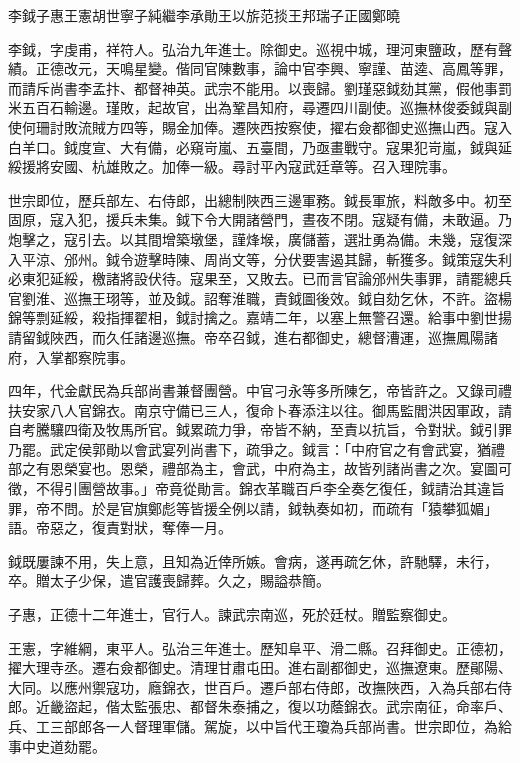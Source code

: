 
\begin{pinyinscope}
李鉞子惠王憲胡世寧子純繼李承勛王以旂范掞王邦瑞子正國鄭曉

李鉞，字虔甫，祥符人。弘治九年進士。除御史。巡視中城，理河東鹽政，歷有聲績。正德改元，天鳴星變。偕同官陳數事，論中官李興、寧謹、苗逵、高鳳等罪，而請斥尚書李孟抃、都督神英。武宗不能用。以喪歸。劉瑾惡鉞劾其黨，假他事罰米五百石輸邊。瑾敗，起故官，出為鞏昌知府，尋遷四川副使。巡撫林俊委鉞與副使何珊討敗流賊方四等，賜金加俸。遷陜西按察使，擢右僉都御史巡撫山西。寇入白羊口。鉞度宣、大有備，必窺岢嵐、五臺間，乃亟畫戰守。寇果犯岢嵐，鉞與延綏援將安國、杭雄敗之。加俸一級。尋討平內寇武廷章等。召入理院事。

世宗即位，歷兵部左、右侍郎，出總制陜西三邊軍務。鉞長軍旅，料敵多中。初至固原，寇入犯，援兵未集。鉞下令大開諸營門，晝夜不閉。寇疑有備，未敢逼。乃炮擊之，寇引去。以其間增築墩堡，謹烽堠，廣儲蓄，選壯勇為備。未幾，寇復深入平涼、邠州。鉞令遊擊時陳、周尚文等，分伏要害遏其歸，斬獲多。鉞策寇失利必東犯延綏，檄諸將設伏待。寇果至，又敗去。已而言官論邠州失事罪，請罷總兵官劉淮、巡撫王珝等，並及鉞。詔奪淮職，責鉞圖後效。鉞自劾乞休，不許。盜楊錦等剽延綏，殺指揮翟相，鉞討擒之。嘉靖二年，以塞上無警召還。給事中劉世揚請留鉞陜西，而久任諸邊巡撫。帝卒召鉞，進右都御史，總督漕運，巡撫鳳陽諸府，入掌都察院事。

四年，代金獻民為兵部尚書兼督團營。中官刁永等多所陳乞，帝皆許之。又錄司禮扶安家八人官錦衣。南京守備已三人，復命卜春添注以往。御馬監閻洪因軍政，請自考騰驤四衛及牧馬所官。鉞累疏力爭，帝皆不納，至責以抗旨，令對狀。鉞引罪乃罷。武定侯郭勛以會武宴列尚書下，疏爭之。鉞言：「中府官之有會武宴，猶禮部之有恩榮宴也。恩榮，禮部為主，會武，中府為主，故皆列諸尚書之次。宴圖可徵，不得引團營故事。」帝竟從勛言。錦衣革職百戶李全奏乞復任，鉞請治其違旨罪，帝不問。於是官旗鄭彪等皆援全例以請，鉞執奏如初，而疏有「猿攀狐媚」語。帝惡之，復責對狀，奪俸一月。

鉞既屢諫不用，失上意，且知為近倖所嫉。會病，遂再疏乞休，許馳驛，未行，卒。贈太子少保，遣官護喪歸葬。久之，賜謚恭簡。

子惠，正德十二年進士，官行人。諫武宗南巡，死於廷杖。贈監察御史。

王憲，字維綱，東平人。弘治三年進士。歷知阜平、滑二縣。召拜御史。正德初，擢大理寺丞。遷右僉都御史。清理甘肅屯田。進右副都御史，巡撫遼東。歷鄖陽、大同。以應州禦寇功，廕錦衣，世百戶。遷戶部右侍郎，改撫陜西，入為兵部右侍郎。近畿盜起，偕太監張忠、都督朱泰捕之，復以功蔭錦衣。武宗南征，命率戶、兵、工三部郎各一人督理軍儲。駕旋，以中旨代王瓊為兵部尚書。世宗即位，為給事中史道劾罷。


\end{pinyinscope}
